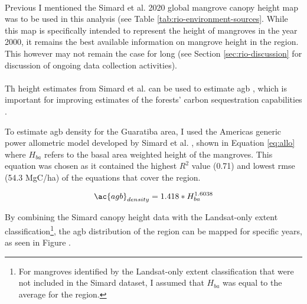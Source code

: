 \paragraph{} \label{sec:rio-mangrove-height} \leavevmode\newline

Previous I mentioned the Simard et al. 2020 global mangrove canopy height map was to be used in this analysis (see Table \ref{tab:rio-environment-sources}. While this map is specifically intended to represent the height of mangroves in the year 2000, it remains the best available information on mangrove height in the region. This however may not remain the case for long (see Section \ref{sec:rio-discussion} for discussion of ongoing data collection activities).

\paragraph{} \label{sec:rio-mangrove-carbon} \leavevmode\newline

Th height estimates from Simard et al. can be used to estimate \ac{agb} \cite{cloughAllometricRelationshipsEstimating1989, fatoyinboEstimatingMangroveAboveground2018, simardMangroveCanopyHeight2019}, which is important for improving estimates of the forests' carbon sequestration capabilities \cite{lagomasinoMeasuringMangroveCarbon2019}. 

To estimate \ac{agb} density for the Guaratiba area, I used the Americas generic power allometric model developed by Simard et al. \cite{simardMangroveCanopyHeight2019}, shown in Equation \ref{eq:allo} where $H_{ba}$ refers to the basal area weighted height of the mangroves. This equation was chosen as it contained the highest $R^2$ value (0.71) and lowest \ac{rmse} (54.3 MgC/ha) of the equations that cover the region. 

\begin{equation}
\label{eq:allo}
\ac{agb}_{density} = 1.418 * H_{ba}^{1.6038}
\end{equation}

By combining the Simard canopy height data with the Landsat-only extent classification\footnote{For mangroves identified by the Landsat-only extent classification that were not included in the Simard dataset, I assumed that $H_{ba}$ was equal to the average for the region.}, the \ac{agb} distribution of the region can be mapped for specific years, as seen in Figure . 

